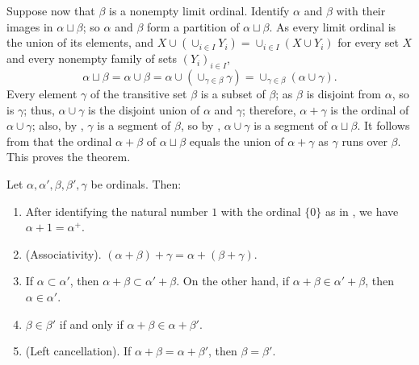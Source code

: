 \documentclass{article}
\begin{document}
Suppose now that \(\beta\) is a nonempty limit ordinal.  Identify
\(\alpha\) and \(\beta\) with their images in \(\alpha \sqcup \beta\);
so \(\alpha\) and \(\beta\) form a partition of
\(\alpha \sqcup \beta\).  As every limit ordinal is the union of its
elements, and
\(X \cup (\cup_{i \in I} Y_i) = \cup_{i \in I} (X \cup Y_i)\) for
every set \(X\) and every nonempty family of sets \((Y_i)_{i \in I}\),
\begin{displaymath}
  \alpha \sqcup \beta = \alpha \cup \beta =
  \alpha \cup (\cup_{\gamma \in \beta} \gamma) =
  \cup_{\gamma \in \beta} (\alpha \cup \gamma).
\end{displaymath}
Every element \(\gamma\) of the transitive set \(\beta\) is a subset
of \(\beta\); as \(\beta\) is disjoint from \(\alpha\), so is
\(\gamma\); thus, \(\alpha \cup \gamma\) is the disjoint union of
\(\alpha\) and \(\gamma\); therefore, \(\alpha + \gamma\) is the
ordinal of \(\alpha \cup \gamma\); also, by ,
\(\gamma\) is a segment of \(\beta\), so by ,
\(\alpha \cup \gamma\) is a segment of \(\alpha \sqcup \beta\).  It
follows from  that the ordinal \(\alpha + \beta\)
of \(\alpha \sqcup \beta\) equals the union of \(\alpha + \gamma\) as
\(\gamma\) runs over \(\beta\).  This proves the theorem.

\begin{theorem}
  \label{thm:506mms8z}
  Let \(\alpha, \alpha', \beta, \beta', \gamma\) be ordinals.  Then:
  \begin{enumerate}
  \item After identifying the natural number \(1\) with the ordinal
    \(\{0\}\) as in , we have
    \(\alpha + 1 = \alpha^+\).
  \item (Associativity).
    \((\alpha + \beta) + \gamma = \alpha + (\beta + \gamma)\).
  \item \label{item:n6u00qz2} If \(\alpha \subset \alpha'\), then
    \(\alpha + \beta \subset \alpha' + \beta\).  On the other hand, if
    \(\alpha + \beta \in \alpha' + \beta\), then
    \(\alpha \in \alpha'\).
  \item \label{item:bhc8ls0b} \(\beta \in \beta'\) if and only if
    \(\alpha + \beta \in \alpha + \beta'\).
  \item (Left cancellation).  If \(\alpha + \beta = \alpha + \beta'\),
    then \(\beta = \beta'\).
  \end{enumerate}
\end{theorem}
\end{document}
